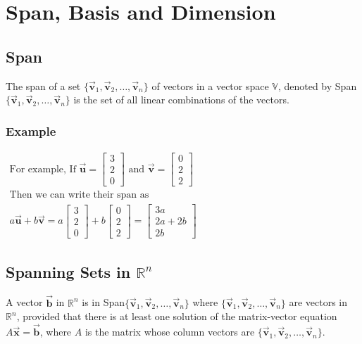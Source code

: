 \documentclass[12pt,landscape,twocolumn]{article}
\let\oldvec\vec
\renewcommand{\vec}[1]{\oldvec{\mathbf{ #1 } } }                    %
\begin{document}
\section{Span, Basis and Dimension}
    \subsection{Span}
    The span of a set $\{\vec{v}_1, \vec{v}_2, \ldots, \vec{v}_n\}$ of vectors in a vector space $\mathbb{V}$, denoted by Span$\{\vec{v}_1, \vec{v}_2, \ldots, \vec{v}_n\}$ is the set of all linear combinations of the vectors.

        \subsubsection{Example}
    $
        \begin{aligned}
            \text{For example, If } \vec{u} = \left[ \begin{array}{c} 3\\2\\0 \end{array} \right] \text{ and } \vec{v} = \left[ \begin{array}{c} 0\\2\\2 \end{array} \right]\\
            \text{Then we can write their span as }\\
            a\vec{u} + b\vec{v} = a\left[ \begin{array}{c} 3\\2\\0 \end{array} \right] + b\left[ \begin{array}{c} 0\\2\\2 \end{array} \right] = \left[ \begin{array}{c} 3a\\2a+2b\\2b \end{array} \right]
        \end{aligned}
    $

    \subsection{Spanning Sets in $\mathbb{R}^n$}
    A vector $\vec{b}$ in $\mathbb{R}^n$ is in Span$\{\vec{v}_1, \vec{v}_2, \ldots, \vec{v}_n\}$ where $\{\vec{v}_1, \vec{v}_2, \ldots, \vec{v}_n\}$ are vectors in $\mathbb{R}^n$, provided that there is at least one solution of the matrix-vector equation $A\vec{x} = \vec{b}$, where $A$ is the matrix whose column vectors are $\{\vec{v}_1, \vec{v}_2, \ldots, \vec{v}_n\}$.
\end{document}
